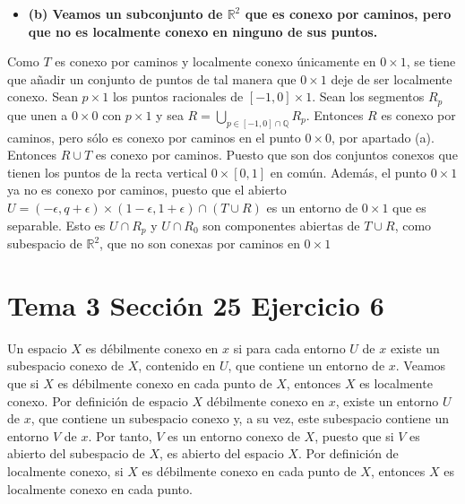 \documentclass{article}
\begin{document}
\begin{itemize}
\item \bf (b) \rm Veamos un subconjunto de $\mathbb{R}^2$ que es conexo por caminos, pero que no es localmente conexo en ninguno de sus puntos.
\end{itemize}
Como $T$ es conexo por caminos y localmente conexo únicamente en $0\times 1$, se tiene que añadir un conjunto de puntos de tal manera que $0\times 1$ deje de ser localmente conexo. Sean $p\times 1$ los puntos racionales de $[-1,0]\times 1$. Sean los segmentos $R_p$ que unen a $0\times 0$ con $p\times 1$ y sea $R=\bigcup_{p\in [-1,0]\cap\mathbb{Q}}R_p$. Entonces $R$ es conexo por caminos, pero sólo es conexo por caminos en el punto $0\times 0$, por apartado (a). Entonces $R\cup T$ es conexo por caminos. Puesto que son dos conjuntos conexos que tienen los puntos de la recta vertical $0\times[0,1]$ en común. Además, el punto $0\times 1$ ya no es conexo por caminos, puesto que el abierto $U=(-\epsilon,q+\epsilon)\times (1-\epsilon,1+\epsilon)\cap (T\cup R)$ es un entorno de $0\times 1$ que es separable. Esto es $U\cap R_p$    y $U\cap R_0$ son componentes abiertas de $T\cup R$, como subespacio de $\mathbb{R}^2$, que no son conexas por caminos en $0\times 1$
\section{Tema 3 Sección 25 Ejercicio 6}
Un espacio $X$ es débilmente conexo en $x$ si para cada entorno $U$ de $x$ existe un subespacio conexo de $X$, contenido en $U$, que contiene un 
entorno de $x$. Veamos que si $X$ es débilmente conexo en cada punto de $X$, entonces $X$ es localmente conexo.
Por definición de espacio $X$ débilmente conexo en $x$, existe un entorno $U$ de $x$, que contiene un subespacio conexo y, a su vez, este subespacio contiene un entorno $V$ de $x$. Por tanto, $V$ es un entorno conexo de $X$, puesto que si $V$ es abierto del subespacio de $X$, es abierto del espacio $X$. Por definición de localmente conexo, si $X$ es débilmente conexo en cada punto de $X$, entonces $X$ es localmente conexo en cada punto.
\end{document}

